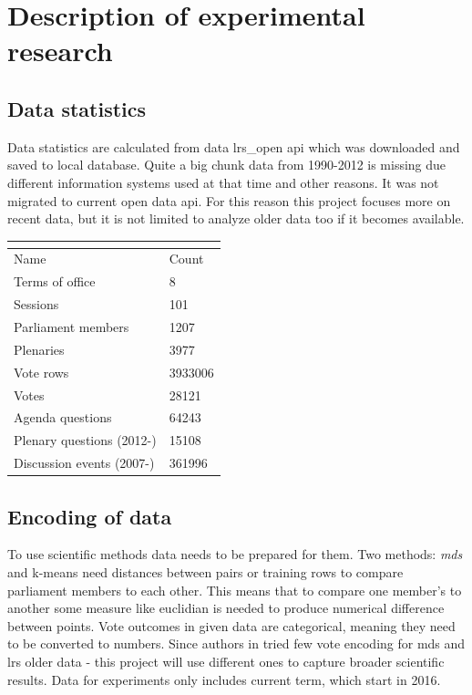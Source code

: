 \documentclass[a4paper,12pt]{article}
\begin{document}
    \section{Description of experimental research}
    \subsection{Data statistics}
    
   	Data statistics are calculated from data \gls{lrs_open} \acrshort{api} which was downloaded and saved to local database. Quite a big chunk data from 1990-2012 is missing due different information systems used at that time and other reasons. It was not migrated to current open data \acrshort{api}. For this reason this project focuses more on recent data, but it is not limited to analyze older data too if it becomes available.
    
   	\noindent
    \begin{center}
    	\begin{tabular}{L{5cm} R{3cm}}
    		\\ 
    		\hline
    		Name & Count \\\hline
    		Terms of office & 8\\
    		Sessions & 101\\
    		Parliament members & 1207\\
    		Plenaries & 3977\\
    		Vote rows & 3933006\\
    		Votes & 28121\\
    		Agenda questions & 64243\\
    		Plenary questions (2012-) & 15108\\
    		Discussion events (2007-) & 361996\\
    		\hline
    	\end{tabular}
    	 \label{tab:data_statistics}
    \end{center}

    
    \hfill 
    
   	\subsection{Encoding of data} 
   	
   	To use scientific methods data needs to be prepared for them. Two methods: \textit{\acrshort{mds}} and \gls{k-means} need distances between pairs or training rows to compare parliament members to each other. This means that to compare one member's to another some measure like \gls{euclidian} is needed to produce numerical difference between points. Vote outcomes in given data are categorical, meaning they need to be converted to numbers. Since authors in  \cite{vytautas_mick_magistrinis} tried few vote encoding for \acrshort{mds} and \gls{lrs} older data - this project will use different ones to capture broader scientific results. Data for experiments only includes current term, which start in 2016.
   	
\end{document}
